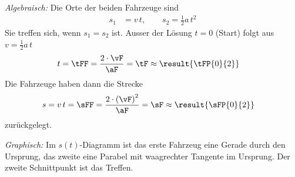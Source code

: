 \emph{Algebraisch:} Die Orte der beiden Fahrzeuge sind
\begin{align}
 s_1 &= v\,t, \qquad s_2 = \frac{1}{2}a\,t^2
\end{align}
Sie treffen sich, wenn $s_1 = s_2$ ist. Ausser der Lösung $t = 0$ (Start) folgt aus $v = \frac{1}{2}a\,t$
\begin{align}
 t &= \tFF = \frac{2\cdot\vF}{\aF} = \tF \approx \result{\tFP{0}{2}}
\end{align}
Die Fahrzeuge haben dann die Strecke
\begin{align}
 s &= v\,t = \sFF = \frac{2\cdot\left(\vF\right)^2}{\aF} = \sF \approx \result{\sFP{0}{2}}
\end{align}
zurückgelegt.

\emph{Graphisch:} Im $s(t)$-Diagramm ist das erste Fahrzeug eine Gerade durch den Ursprung, das zweite eine Parabel mit waagrechter Tangente im Ursprung. Der zweite Schnittpunkt ist das Treffen.

\begin{center}
\end{center}
